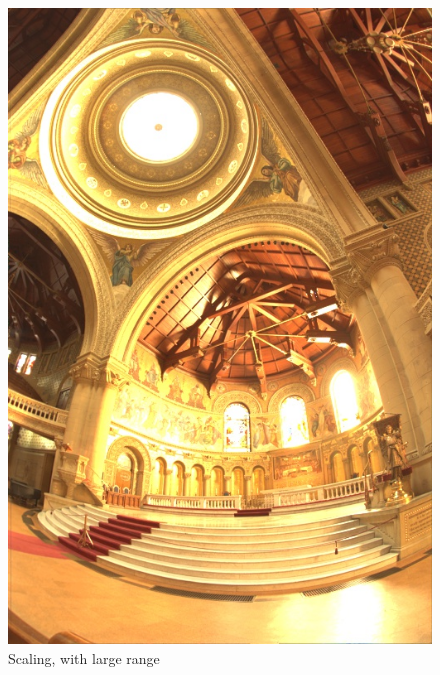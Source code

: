 \documentclass{article}
\begin{document}
    \begin{figure}[!htb]
      \includegraphics[scale=.27]{./data/1/linscl/mn.jpg}
      \caption{Scaling, with large range}
    \endminipage\hfill

\end{figure}
\end{document}
